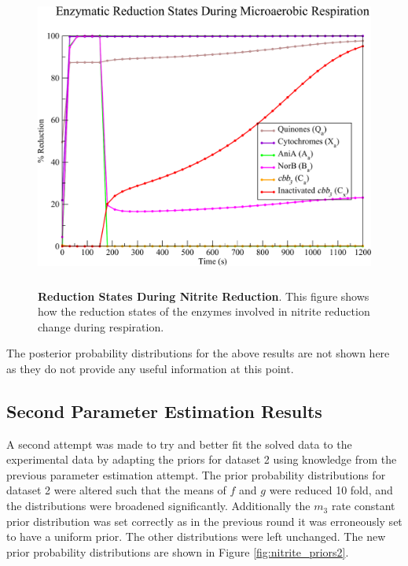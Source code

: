 \begin{figure}[tbp]
 \centering
 \includegraphics[height=10cm, clip=true]{./07-nitritereduction/data/dataset2redox-1.pdf}
 \caption[Reduction States During Nitrite Reduction]{{\bf Reduction States During Nitrite Reduction}. This figure shows how the reduction states of the enzymes involved in nitrite reduction change during respiration.
  \label{fig:nitrite_ds2_redox1}}
\end{figure}

The posterior probability distributions for the above results are not shown here as they do not provide any useful information at this point.

\subsection{Second Parameter Estimation Results}
A second attempt was made to try and better fit the solved data to the experimental data by adapting the priors for dataset 2 using knowledge from the previous parameter estimation attempt. The prior probability distributions for dataset 2 were altered such that the means of $f$ and $g$ were reduced 10 fold, and the distributions were broadened significantly. Additionally the $m_3$ rate constant prior distribution was set correctly as in the previous round it was erroneously set to have a uniform prior. The other distributions were left unchanged. The new prior probability distributions are shown in Figure \ref{fig:nitrite_priors2}.


